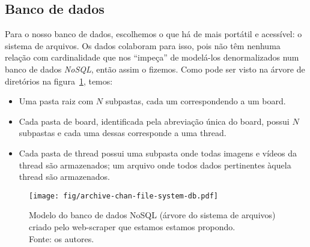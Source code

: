 \subsection{Banco de dados}

Para o nosso banco de dados, escolhemos o que há de mais portátil e acessível: o sistema de arquivos.
Os dados colaboram para isso, pois não têm nenhuma relação com cardinalidade que nos ``impeça'' de modelá-los denormalizados num banco de dados \textit{NoSQL}, então assim o fizemos.
Como pode ser visto na árvore de diretórios na figura~\ref{fig:archive-chan-file-system-db}, temos:

\begin{itemize}
    \item Uma pasta raiz com $N$ subpastas, cada um correspondendo a um board.
    \item Cada pasta de board, identificada pela abreviação única do board, possui $N$ subpastas e cada uma dessas corresponde a uma thread.
    \item Cada pasta de thread possui 
        \subitem uma subpasta  onde todas imagens e vídeos da thread são armazenados;
        \subitem um arquivo  onde todos dados pertinentes àquela thread são armazenados.
\end{itemize}

\begin{figure}[htbp]
    \centering
    \texttt{[image: fig/archive-chan-file-system-db.pdf]}
    \caption[Scraper File System Dabatase model]{
        Modelo do banco de dados NoSQL (árvore do sistema de arquivos) criado pelo web-scraper que estamos estamos propondo.\\
        Fonte: os autores.
    }
    \label{fig:archive-chan-file-system-db}
\end{figure}
